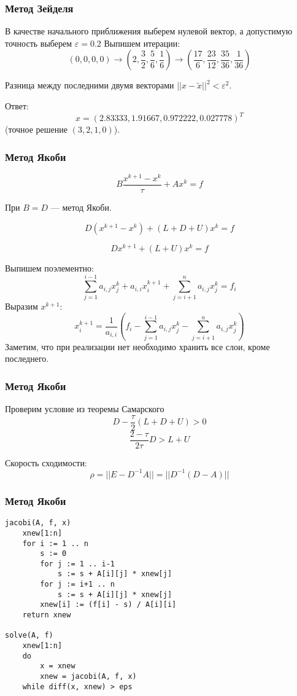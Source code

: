 \documentclass[10pt]{beamer}
\begin{document}
\begin{frame}[fragile]
\frametitle{Метод Зейделя}
В качестве начального приближения выберем нулевой вектор, а допустимую точность выберем $\varepsilon = 0.2$ Выпишем итерации:
$$
(0, 0, 0, 0)  \rightarrow
\left( 2, \frac{3}{2}, \frac{5}{6}, \frac{1}{6} \right) \rightarrow
\left( \frac{17}{6}, \frac{23}{12}, \frac{35}{36}, \frac{1}{36} \right)
$$

Разница между последними двумя векторами $||x - \tilde{x}||^2 < \varepsilon^2$. 

Ответ: 
$$x = (2.83333, 1.91667, 0.972222, 0.027778)^T$$ 
(точное решение $(3, 2, 1, 0)$).

\end{frame}


\begin{frame}[fragile]
\frametitle{Метод Якоби}

$$B \frac{x^{k+1} - x^k}{\tau} + A x^k = f$$

\vfill
При $B = D$ --- метод Якоби.

$$D (x^{k+1} - x^k) + (L + D + U) x^k = f$$

$$D x^{k+1} + (L + U) x^k = f$$

\vfill

Выпишем поэлементно:
$$\sum_{j=1}^{i-1} a_{i,j} x_{j}^k + a_{i,i} x_{i}^{k+1} + \sum_{j=i+1}^{n} a_{i,j} x_{j}^k = f_i$$
Выразим $x^{k+1}$:
$$x_{i}^{k+1} = \frac{1}{a_{i,i}} \left( f_i - \sum_{j = 1}^{i-1} a_{i,j} x_{j}^{k} - \sum_{j = i+1}^{n} a_{i,j} x_{j}^k \right) $$
Заметим, что при реализации нет необходимо хранить все слои, кроме последнего.
\end{frame}

\begin{frame}[fragile]
\frametitle{Метод Якоби}

Проверим условие из теоремы Самарского
$$ D - \frac{\tau}{2} (L + D + U) > 0$$
$$ \frac{2 - \tau}{2 \tau} D > L + U$$

Скорость сходимости:
$$\rho = ||E - D^{-1}A|| = ||D^{-1}(D - A)||$$

\end{frame}

\begin{frame}[fragile]
\frametitle{Метод Якоби}
\begin{lstlisting}
jacobi(A, f, x)
	xnew[1:n]
    for i := 1 .. n
        s := 0
        for j := 1 .. i-1
            s := s + A[i][j] * xnew[j]
        for j := i+1 .. n
            s := s + A[i][j] * xnew[j]
        xnew[i] := (f[i] - s) / A[i][i]
    return xnew

solve(A, f)
	xnew[1:n]
	do
		x = xnew
		xnew = jacobi(A, f, x)
	while diff(x, xnew) > eps
\end{lstlisting}
\end{frame}
\end{document}
